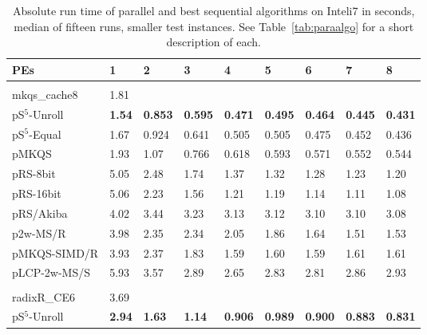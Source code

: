 \documentclass[a4paper]{myjournal}
\begin{document}
\def\tabcolsep{4pt}
\begin{table}\centering\small
\caption{Absolute run time of parallel and best sequential algorithms on Inteli7 in seconds, median of fifteen runs, smaller test instances. See Table~\ref{tab:paraalgo} for a short description of each.}\label{tab:absrun-Inteli7b}
\begin{tabularx}{\linewidth}{l|*{8}{>{\hfill}X}|@{}}
PEs          & 1   & 2 & 3 & 4 & 5 & 6 & 7 & 8                                                                                      \\ \hline
& \multicolumn{8}{l|}{\textbf{Sinha URLs} (complete), $n = 10\,\text{M}$, $N = 304\,\text{Mi}$, $\frac{D}{N} = 97.5\,\%$} \\ \cline{2-9}
mkqs\_cache8 & 1.81 &  &  &  &  &  &  &  \\
pS$^5$-Unroll & \bf 1.54 & \bf 0.853 & \bf 0.595 & \bf 0.471 & \bf 0.495 & \bf 0.464 & \bf 0.445 & \bf 0.431 \\
 pS$^5$-Equal &     1.67 &     0.924 &     0.641 &     0.505 &     0.505 &     0.475 &     0.452 &     0.436 \\
        pMKQS &     1.93 &      1.07 &     0.766 &     0.618 &     0.593 &     0.571 &     0.552 &     0.544 \\
     pRS-8bit &     5.05 &      2.48 &      1.74 &      1.37 &      1.32 &      1.28 &      1.23 &      1.20 \\
    pRS-16bit &     5.06 &      2.23 &      1.56 &      1.21 &      1.19 &      1.14 &      1.11 &      1.08 \\
    pRS/Akiba &     4.02 &      3.44 &      3.23 &      3.13 &      3.12 &      3.10 &      3.10 &      3.08 \\
     p2w-MS/R &     3.98 &      2.35 &      2.34 &      2.05 &      1.86 &      1.64 &      1.51 &      1.53 \\
 pMKQS-SIMD/R &     3.93 &      2.37 &      1.83 &      1.59 &      1.60 &      1.59 &      1.61 &      1.61 \\
 pLCP-2w-MS/S &     5.93 &      3.57 &      2.89 &      2.65 &      2.83 &      2.81 &      2.86 &      2.93 \\ \hline
& \multicolumn{8}{l|}{\textbf{Sinha DNA} (complete), $n = 31.6\,\text{M}$, $N = 302\,\text{Mi}$, $\frac{D}{N} = 100\,\%$} \\ \cline{2-9}
radixR\_CE6 & 3.69 &  &  &  &  &  &  &  \\
pS$^5$-Unroll & \bf 2.94 & \bf 1.63 & \bf 1.14 & \bf 0.906 & \bf 0.989 & \bf 0.900 & \bf 0.883 & \bf 0.831 \\

\end{tabularx}
\end{table}
\end{document}
